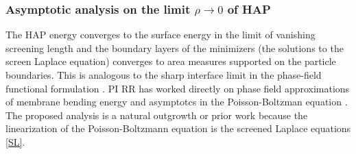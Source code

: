 \subsubsection{Asymptotic analysis on the limit $\rho\rightarrow 0$ of HAP}
The HAP energy converges to the surface energy in the limit of vanishing screening length 
and the boundary layers of the minimizers (the solutions to the screen Laplace equation) converges to 
area measures supported on the particle boundaries.  This is analogous to the sharp interface limit in the phase-field functional formulation \cite{Modica87, MODICA1987487, LuMo89}. 
PI RR has worked directly on phase field approximations of membrane bending energy 
\cite{0951-7715-18-3-016} and asymptotcs in the Poisson-Boltzman equation \cite{1531-3492_2006_2_357,Lee2018}.
The proposed analysis is a natural outgrowth or prior work because the linearization of the Poisson-Boltzmann equation is the screened Laplace equations \eqref{SL}.

